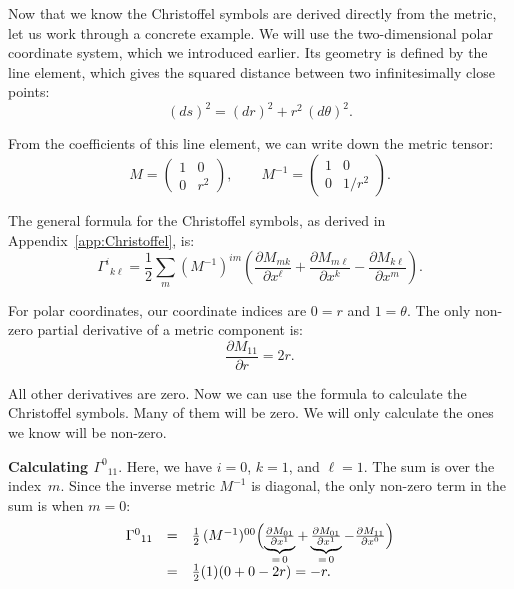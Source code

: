 \documentclass[twocolumn]{article}
\begin{document}
Now that we know the Christoffel symbols are derived directly from the
metric, let us work through a concrete example.  We will use the
two-dimensional polar coordinate system, which we introduced earlier.
Its geometry is defined by the line element, which gives the squared
distance between two infinitesimally close points:
\begin{equation}
  (ds)^2 = (dr)^2 + r^2\,(d\theta)^2.
\end{equation}

From the coefficients of this line element, we can write down the metric
tensor:
\begin{equation}
  M = \begin{pmatrix} 1 & 0 \\ 0 & r^2 \end{pmatrix},
  \qquad
  M^{-1} = \begin{pmatrix} 1 & 0 \\ 0 & 1/r^2 \end{pmatrix}.
\end{equation}

The general formula for the Christoffel symbols, as derived in
Appendix~\ref{app:Christoffel}, is:
\begin{equation}
  \Gamma^i{}_{k\ell}
    = \frac{1}{2} \sum_m (M^{-1})^{im}
      \left(
        \frac{\partial M_{mk}}{\partial x^\ell}
        + \frac{\partial M_{m\ell}}{\partial x^k}
        - \frac{\partial M_{k\ell}}{\partial x^m}
      \right).
\end{equation}

For polar coordinates, our coordinate indices are $0=r$ and $1=\theta$.
The only non-zero partial derivative of a metric component is:
\begin{equation}
  \frac{\partial M_{11}}{\partial r} = 2r.
\end{equation}

All other derivatives are zero.  Now we can use the formula to calculate
the Christoffel symbols.  Many of them will be zero.  We will only
calculate the ones we know will be non-zero.

{\bf Calculating $\Gamma^0{}_{11}$}.
Here, we have $i=0$, $k=1$, and $\ell=1$.  The sum is over the
index~$m$.  Since the inverse metric $M^{-1}$ is diagonal, the only
non-zero term in the sum is when $m=0$:
\begin{equation}
  \begin{array}{lcl}
  \Gamma^0{}_{11}
    & = & \tfrac{1}{2}\,(M^{-1})^{00}
      \Bigl(
        \underbrace{\tfrac{\partial M_{01}}{\partial x^1}}_{=\,0}
        + \underbrace{\tfrac{\partial M_{01}}{\partial x^1}}_{=\,0}
        - \tfrac{\partial M_{11}}{\partial x^0}
      \Bigr)\\
    & = & \tfrac{1}{2}(1)(0 + 0 - 2r) = -r.
    \end{array}
\end{equation}
\end{document}
